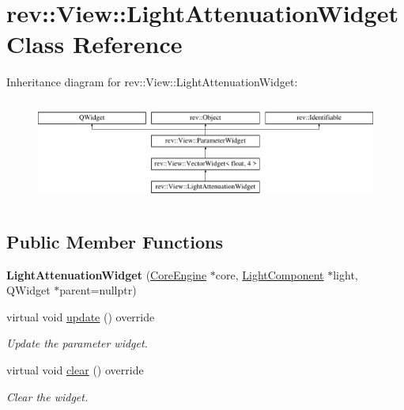 \hypertarget{classrev_1_1_view_1_1_light_attenuation_widget}{}\section{rev\+::View\+::Light\+Attenuation\+Widget Class Reference}
\label{classrev_1_1_view_1_1_light_attenuation_widget}
Inheritance diagram for rev\+::View\+::Light\+Attenuation\+Widget\+:\begin{figure}[H]
\begin{center}
\leavevmode
\includegraphics[height=3.409437cm]{classrev_1_1_view_1_1_light_attenuation_widget}
\end{center}
\end{figure}
\subsection*{Public Member Functions}
\begin{DoxyCompactItemize}
\item 
\mbox{\label{classrev_1_1_view_1_1_light_attenuation_widget_ade98b6c8c11db1cb360d63dcbe1ed4ff}} 
{\bfseries Light\+Attenuation\+Widget} (\mbox{\hyperlink{classrev_1_1_core_engine}{Core\+Engine}} $\ast$core, \mbox{\hyperlink{classrev_1_1_light_component}{Light\+Component}} $\ast$light, Q\+Widget $\ast$parent=nullptr)
\item 
\mbox{\label{classrev_1_1_view_1_1_light_attenuation_widget_af6e71ef10c956c420c6c65de7d32aae6}} 
virtual void \mbox{\hyperlink{classrev_1_1_view_1_1_light_attenuation_widget_af6e71ef10c956c420c6c65de7d32aae6}{update}} () override
\begin{DoxyCompactList}\small\item\em Update the parameter widget. \end{DoxyCompactList}\item 
\mbox{\label{classrev_1_1_view_1_1_light_attenuation_widget_a5cc50a76d5e2bc86ffc038a24f1ba332}} 
virtual void \mbox{\hyperlink{classrev_1_1_view_1_1_light_attenuation_widget_a5cc50a76d5e2bc86ffc038a24f1ba332}{clear}} () override
\begin{DoxyCompactList}\small\item\em Clear the widget. \end{DoxyCompactList}\end{DoxyCompactItemize}
